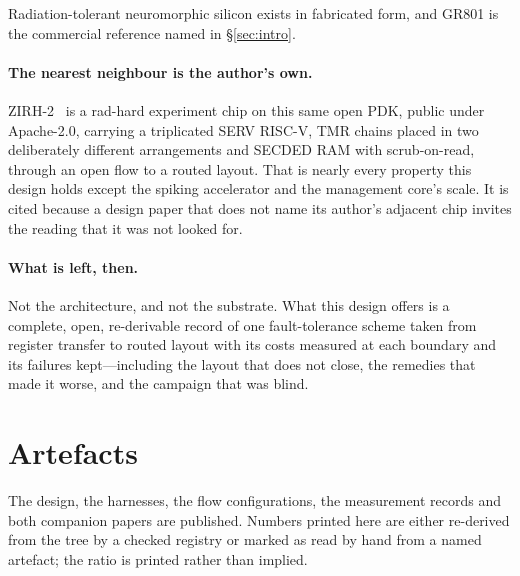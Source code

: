 \documentclass[11pt,a4paper]{article}
\begin{document}
Radiation-tolerant neuromorphic silicon exists in fabricated form, and
GR801 is the commercial reference named in \S\ref{sec:intro}.

\paragraph{The nearest neighbour is the author's own.}
ZIRH-2~\cite{zirh2_2026} is a
rad-hard experiment chip on this same open PDK, public under
Apache-2.0, carrying a triplicated SERV RISC-V, TMR chains placed in two
deliberately different arrangements and SECDED RAM with scrub-on-read,
through an open flow to a routed layout. That is nearly every property
this design holds except the spiking accelerator and the management
core's scale. It is cited because a design paper that does not name its
author's adjacent chip invites the reading that it was not looked for.

\paragraph{What is left, then.} Not the architecture, and not the
substrate. What this design offers is a complete, open, re-derivable
record of one fault-tolerance scheme taken from register transfer to
routed layout with its costs measured at each boundary and its failures
kept---including the layout that does not close, the remedies that made
it worse, and the campaign that was blind.

\section{Artefacts}
\label{sec:artefacts}

The design, the harnesses, the flow configurations, the measurement
records and both companion papers are published. Numbers printed here
are either re-derived from the tree by a checked registry or marked as
read by hand from a named artefact; the ratio is printed rather than
implied.



\end{document}
